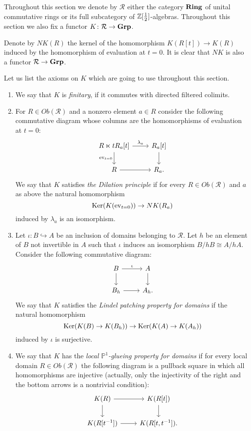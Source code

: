 \documentclass[oneside, 11pt]{amsart} \pdfoutput=1
\begin{document}
Throughout this section we denote by $\mathcal{R}$ either the category ${\normalfont\textbf{Ring}}$ of unital commutative rings or its full subcategory of $\mathbb{Z}[\tfrac{1}{2}]$-algebras. Throughout this section we also fix a functor $K \colon \mathcal{R} \to {\normalfont\textbf{Grp}}$.

\begin{df}\label{df:NK} 
Denote by $NK(R)$ the kernel of the homomorphism $K(R[t]) \to K(R)$ induced by the homomorphism of evaluation at $t=0$. It is clear that $NK$ is also a functor $\mathcal{R} \to {\normalfont\textbf{Grp}}$.
\end{df}

\begin{df}\label{df:key-assumptions}
Let us list the axioms on $K$ which are going to use throughout this section.
 \begin{enumerate}[label=(P\normalfont\arabic*)]
  \item \label{CFC} We say that $K$ is {\it finitary}, if it commutes with directed filtered colimits.
  \item \label{DP} For $R \in Ob(\mathcal{R})$ and a nonzero element $a \in R$ consider the following commutative diagram whose columns are the homomorphisms of evaluation at $t=0$:
  \[\begin{tikzcd} R \ltimes t R_a[t] \ar{r}{\lambda_a} \ar{d}[swap]{\eval_{t=0}} & R_a[t] \ar{d}\\ R \ar{r} & R_a. \end{tikzcd}\]
  We say that $K$ satisfies {\it the Dilation principle} if for every $R \in Ob(\mathcal{R})$ and $a$ as above the natural homomorphism
  \begin{equation}\label{eq:DP-map} \mathop{\mathrm{Ker}}\nolimits(K(\mathrm{ev}_{t=0})) \to NK(R_a)\end{equation}
  induced by $\lambda_a$ is an isomorphism.
  \item \label{LPP} Let $\iota \colon B \hookrightarrow A$ be an inclusion of domains belonging to $\mathcal{R}$. Let $h$ be an element of $B$ not invertible in $A$ such that $\iota$ induces an isomorphism $B / hB \cong A / hA$. Consider the following commutative diagram: 
  \[\begin{tikzcd} B \ar{r}{\iota} \ar{d} & A \ar{d}\\ B_h \ar{r} & A_h. \end{tikzcd}\]
  We say that $K$ satisfies the {\it Lindel patching property for domains} if the natural homomorphism \[\mathop{\mathrm{Ker}}\nolimits(K(B) \to K(B_h)) \to \mathop{\mathrm{Ker}}\nolimits(K(A) \to K(A_h))\] induced by $\iota$ is surjective.
  \item \label{PGP} We say that $K$ has the {\it local $\mathbb{P}^1$-glueing property for domains} if for every local domain $R \in Ob(\mathcal{R})$ the following diagram is a pullback square in which all homomorphisms are injective (actually, only the injectivity of the right and the bottom arrows is a nontrivial condition): \begin{equation}\label{eq:P1-square} \begin{tikzcd} K(R) \ar[r] \ar[d] & K(R[t]) \arrow{d} \\ K(R[t^{-1}]) \ar{r} & K(R[t, t^{-1}]). \end{tikzcd} \end{equation}

\end{enumerate}
\end{df}
\end{document}
